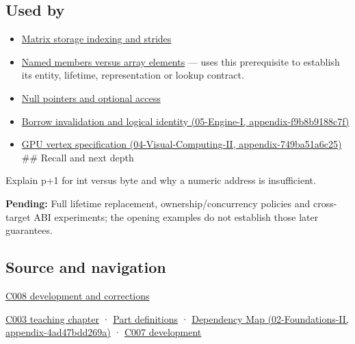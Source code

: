 \subsection{Used by}\label{appendix-6af5921bc853-used-by}

\begin{itemize}
\item
  \hyperref[appendix-ffdc1d4e5350]{Matrix storage indexing and strides}
\item
  \hyperref[appendix-3f7e15effba6]{Named members versus array elements} --- uses this prerequisite to establish its entity, lifetime, representation or lookup contract.
\item
  \hyperref[appendix-afae48c31800]{Null pointers and optional access}
\item
  \href{../05-Engine-I/main.pdf\#nameddest=appendix-f9b8b9188c7f}{Borrow invalidation and logical identity (05-Engine-I, appendix-f9b8b9188c7f)}
\item
  \href{../04-Visual-Computing-II/main.pdf\#nameddest=appendix-749ba51a6c25}{GPU vertex specification (04-Visual-Computing-II, appendix-749ba51a6c25)} \#\# Recall and next depth
\end{itemize}

Explain p+1 for int versus byte and why a numeric address is insufficient.

\textbf{Pending:} Full lifetime replacement, ownership/concurrency policies and cross-target ABI experiments; the opening examples do not establish those later guarantees.

\subsection{Source and navigation}\label{appendix-6af5921bc853-source-and-navigation}

\hyperref[appendix-fd090d982a15-m008---parts-113-126]{C008 development and corrections}

\hyperref[01-foundations-i-ch002-where-the-bytes-live]{C003 teaching chapter} · \hyperref[appendix-fd090d982a15-m003---parts-41-60]{Part definitions} · \href{../02-Foundations-II/main.pdf\#nameddest=appendix-4ad47bdd269a}{Dependency Map (02-Foundations-II, appendix-4ad47bdd269a)} · \hyperref[01-foundations-i-ch003-bringing-the-object-model-back-to-bytes]{C007 development}
